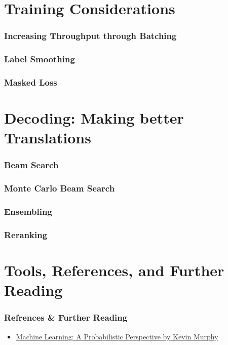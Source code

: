 \documentclass{beamer}
\begin{document}
\section{Training Considerations}

\begin{frame}
\frametitle{Increasing Throughput through Batching}

\end{frame}

\begin{frame}
\frametitle{Label Smoothing}

\end{frame}

\begin{frame}
\frametitle{Masked Loss}

\end{frame}


\section{Decoding: Making better Translations}

\begin{frame}
\frametitle{Beam Search}

\end{frame}

\begin{frame}
\frametitle{Monte Carlo Beam Search}

\end{frame}

\begin{frame}
\frametitle{Ensembling}

\end{frame}

\begin{frame}
\frametitle{Reranking}

\end{frame}


\section{Tools, References, and Further Reading}


\begin{frame}
\frametitle{Refrences \& Further Reading}
  \begin{itemize}
    \item \href{https://www.cs.ubc.ca/~murphyk/MLbook/}{Machine Learning: A Probabilistic Perspective by Kevin Murphy}
  \end{itemize}
\end{frame}


\end{document}
